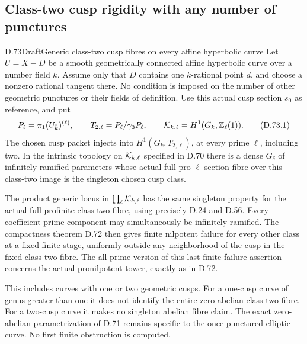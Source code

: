 \subsection{Class-two cusp rigidity with any number of punctures}

\begin{statement}{D.73}{Draft}{Generic class-two cusp fibres on every affine hyperbolic curve}
Let \(U=X-D\) be a smooth geometrically connected affine
hyperbolic curve over a number field \(k\). Assume only that
\(D\) contains one \(k\)-rational point \(d\), and choose a
nonzero rational tangent there. No condition is imposed on
the number of other geometric punctures or their fields of
definition. Use this actual cusp section \(s_0\) as reference,
and put
\[
 P_\ell=\pi_1(U_{\bar k})^{(\ell)},\qquad
 T_{2,\ell}=P_\ell/\gamma_3P_\ell,\qquad
 {\cal K}_{k,\ell}=H^1(G_k,\mathbb Z_\ell(1)).
                                                        \tag{D.73.1}
\]
The chosen cusp packet injects into
\(H^1(G_k,T_{2,\ell})\), at every prime \(\ell\), including
two. In the intrinsic topology on \({\cal K}_{k,\ell}\)
specified in D.70 there is a dense \(G_\delta\) of
infinitely ramified parameters whose actual full pro-\(\ell\)
section fibre over this class-two image is the singleton
chosen cusp class.

The product generic locus in
\(\prod_\ell{\cal K}_{k,\ell}\) has the same singleton
property for the actual full profinite class-two fibre,
using precisely D.24 and D.56. Every coefficient-prime
component may simultaneously be infinitely ramified.
The compactness theorem D.72 then gives finite nilpotent
failure for every other class at a fixed finite stage,
uniformly outside any neighborhood of the cusp in the
fixed-class-two fibre. The all-prime version of this
last finite-failure assertion concerns the actual
pronilpotent tower, exactly as in D.72.

This includes curves with one or two geometric cusps.
For a one-cusp curve of genus greater than one it does
not identify the entire zero-abelian class-two fibre.
For a two-cusp curve it makes no singleton abelian
fibre claim. The exact zero-abelian parametrization
of D.71 remains specific to the once-punctured elliptic
curve. No first finite obstruction is computed.
\end{statement}

